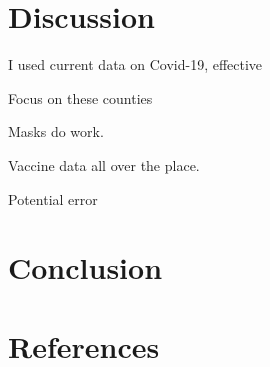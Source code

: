 \documentclass[
  12pt,
]{article}
\begin{document}
\hypertarget{discussion}{%
\section{Discussion}\label{discussion}}

I used current data on Covid-19, effective

Focus on these counties

Masks do work.

Vaccine data all over the place.

Potential error

\hypertarget{conclusion}{%
\section{Conclusion}\label{conclusion}}

\hypertarget{references}{%
\section{References}\label{references}}
\end{document}
